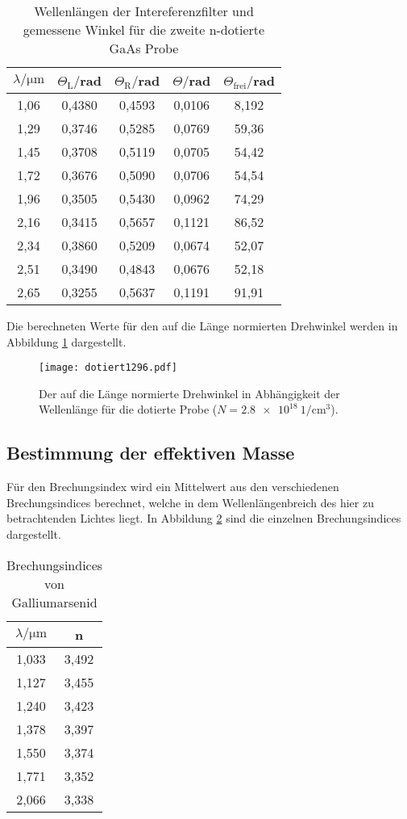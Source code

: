 \begin{table}[H]
  \centering
  \caption{Wellenlängen der Intereferenzfilter und gemessene Winkel für die zweite n-dotierte GaAs Probe}
  \label{tab:zweite}
  \begin{tabular}{c c c c c}
    \toprule
    $\lambda/\mathrm{\mu m}$ & $\Theta_{\mathrm{L}}/$rad & $\Theta_{\mathrm{R}}/$rad  & $\Theta /$rad & $\Theta_{\mathrm{frei}}/$rad\\
    \midrule
    1,06  & 0,4380 & 0,4593 & 0,0106 & 8,192 \\
    1,29  & 0,3746 & 0,5285 & 0,0769 & 59,36 \\
    1,45  & 0,3708 & 0,5119 & 0,0705 & 54,42 \\
    1,72  & 0,3676 & 0,5090 & 0,0706 & 54,54 \\
    1,96  & 0,3505 & 0,5430 & 0,0962 & 74,29 \\
    2,16  & 0,3415 & 0,5657 & 0,1121 & 86,52 \\
    2,34  & 0,3860 & 0,5209 & 0,0674 & 52,07 \\
    2,51  & 0,3490 & 0,4843 & 0,0676 & 52,18 \\
    2,65  & 0,3255 & 0,5637 & 0,1191 & 91,91 \\
    \bottomrule
  \end{tabular}
\end{table}


Die berechneten Werte für den auf die Länge normierten Drehwinkel werden
in Abbildung \ref{fig:rein} dargestellt.
\begin{figure}[H]
  \centering
  \texttt{[image: dotiert1296.pdf]}
  \caption{Der auf die Länge normierte Drehwinkel in Abhängigkeit der Wellenlänge für die dotierte Probe ($N = \SI{2.8e18}{1\per\centi\meter^3}$).}
  \label{fig:rein}
\end{figure}


\subsection{Bestimmung der effektiven Masse}
Für den Brechungsindex wird ein Mittelwert aus den verschiedenen Brechungsindices berechnet,
welche in dem Wellenlängenbreich des hier zu betrachtenden Lichtes liegt. In Abbildung \ref{tab:Brechung}
sind die einzelnen Brechungsindices dargestellt.

\begin{table}[H]
  \centering
  \caption{Brechungsindices von Galliumarsenid}
  \label{tab:Brechung}
  \begin{tabular}{c c}
    \toprule
    $\lambda/\mathrm{\mu m}$ & n\\
    \midrule
    1,033  & 3,492 \\
    1,127  & 3,455 \\
    1,240  & 3,423 \\
    1,378  & 3,397 \\
    1,550  & 3,374 \\
    1,771  & 3,352 \\
    2,066  & 3,338 \\
    \bottomrule
  \end{tabular}
\end{table}

